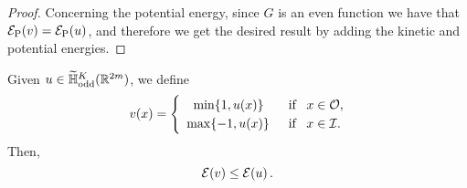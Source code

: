 \begin{proof}
Concerning the potential energy, since $G$ is an even function we have that $\mathcal{E}_\mathrm{P}(v) = \mathcal{E}_\mathrm{P}(u)$, and therefore we get the desired result by adding the kinetic and potential energies.
\end{proof}

\begin{lemma}
\label{Lemma:TruncationOfFunctions2DecreaseEnergy}
Given $u\in \widetilde{\mathbb{H}}^K_{\mathrm{odd}}(\mathbb{R}^{2m})$, we define
\begin{equation*}
v(x) = \begin{cases}
\hspace{3.6mm}\min\{1,u(x)\} \,\,\, &\text{if } \,\,\, x\in\mathcal{O},\\
\,\,\,\max\{-1,u(x)\} \,\,\, &\text{if } \,\,\, x\in\mathcal{I}.
\end{cases}
\end{equation*}
Then,
$$ \mathcal{E}(v) \leq \mathcal{E}(u)\,.  $$
\end{lemma}

